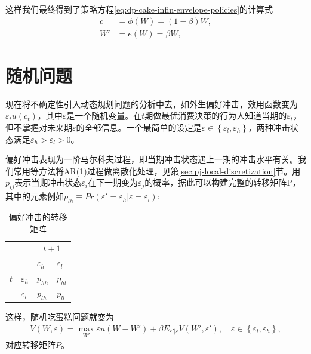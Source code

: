 这样我们最终得到了策略方程\eqref{eq:dp-cake-infin-envelope-policies}的计算式
\begin{equation}
  \label{eq:dp-cake-infin-envelope-policies-2}
  \begin{split}
    c & = \phi \left(W \right) = \left( 1 - \beta \right) W , \\
    W' & = e \left(W \right) = \beta W,
  \end{split}
\end{equation}

\section{随机问题}
\label{sec:dp-sthochastic}
现在将不确定性引入动态规划问题的分析中去，如外生偏好冲击，效用函数变为$\varepsilon_{t} u(c_{t})$，其中$\varepsilon$是一个随机变量。在$t$期做最优消费决策的行为人知道当期的$\varepsilon_{t}$，但不掌握对未来期$\varepsilon$的全部信息。一个最简单的设定是$\varepsilon \in \left\{ \varepsilon_{l}, \varepsilon_{h} \right\}$，两种冲击状态满足$\varepsilon_{h} > \varepsilon_{l} > 0$。

偏好冲击表现为一阶马尔科夫过程，即当期冲击状态遇上一期的冲击水平有关。我们常用\cite{Tauchen:1986gi}等方法将AR(1)过程做离散化处理，见第\ref{sec:pj-local-discretization}节。用$p_{ij}$表示当期冲击状态$\varepsilon_{i}$在下一期变为$\varepsilon_{j}$的概率，据此可以构建完整的转移矩阵P，其中的元素例如$p_{lh} \equiv Pr \left( \varepsilon' = \varepsilon_{h} \big| \varepsilon = \varepsilon_{l} \right)$:
\begin{table}[htbp]
\label{table:dp-cake-infin-transmission-matrix}
\caption{偏好冲击的转移矩阵}
\begin{center}
\begin{tabular}{llll}

 &  & \multicolumn{ 2}{c}{$t+1$} \\
 &  & $\varepsilon_{h}$ & $\varepsilon_{l}$ \\ \cline{ 3- 4}
\multicolumn{1}{c}{$t$} & $\varepsilon_{h}$ & $p_{hh}$ & $p_{hl}$ \\ \cline{ 3- 4}
\multicolumn{ 1}{l}{} & $\varepsilon_{l}$ & $p_{lh}$ & $p_{ll}$ \\ \cline{ 3- 4}%
\end{tabular}
\end{center}
\end{table}

这样，随机吃蛋糕问题就变为
\begin{equation*}
  \begin{split}
    V \left( W, \varepsilon \right)
    = \max_{W'} \varepsilon u \left( W - W' \right)
    + \beta E_{\varepsilon' | \varepsilon} V \left( W', \varepsilon' \right), \quad \varepsilon \in  \left\{ \varepsilon_{l}, \varepsilon_{h} \right\},
  \end{split}
\end{equation*}
对应转移矩阵$P$。

